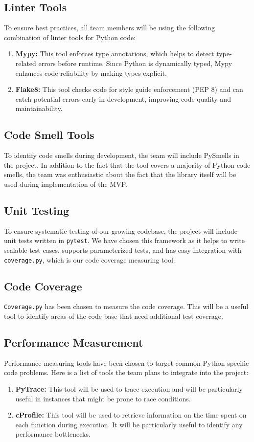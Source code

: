 \documentclass{article}
\begin{document}
\subsection{Linter Tools}
To ensure best practices, all team members will be using the following combination of linter tools for Python code:
\begin{enumerate}
    \item \textbf{Mypy:} This tool enforces type annotations, which helps to detect type-related errors before runtime. Since Python is dynamically typed, Mypy enhances code reliability by making types explicit.
    \item \textbf{Flake8:} This tool checks code for style guide enforcement (PEP 8) and can catch potential errors early in development, improving code quality and maintainability.
\end{enumerate}

\subsection{Code Smell Tools}
To identify code smells during development, the team will include PySmells in the project. In addition to the fact that the tool covers a majority of Python code smells, the team was enthusiastic about the fact that the library itself will be used during implementation of the MVP.

\subsection{Unit Testing}
To ensure systematic testing of our growing codebase, the project will include unit tests written in \texttt{pytest}. We have chosen this framework as it helps to write scalable test cases, supports parameterized tests, and has easy integration with \texttt{coverage.py}, which is our code coverage measuring tool.

\subsection{Code Coverage}
\texttt{Coverage.py} has been chosen to measure the code coverage. This will be a useful tool to identify areas of the code base that need additional test coverage.

\subsection{Performance Measurement}
Performance measuring tools have been chosen to target common Python-specific code problems. Here is a list of tools the team plans to integrate into the project:
\begin{enumerate}
    \item \textbf{PyTrace:} This tool will be used to trace execution and will be particularly useful in instances that might be prone to race conditions.
    \item \textbf{cProfile:} This tool will be used to retrieve information on the time spent on each function during execution. It will be particularly useful to identify any performance bottlenecks.
\end{enumerate}
\end{document}
